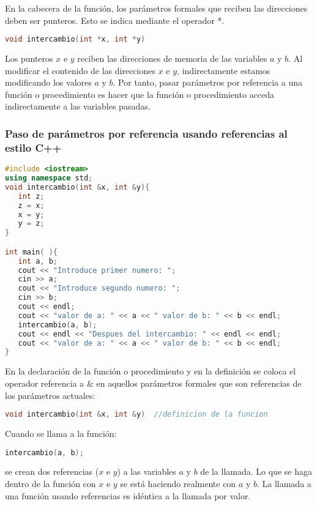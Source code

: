 En la cabecera de la función, los parámetros formales que reciben las direcciones deben ser punteros. Esto se indica mediante el operador *.

\begin{lstlisting}[language=C++]
void intercambio(int *x, int *y)
\end{lstlisting}

Los punteros $x$ e $y$ reciben las direcciones de memoria de las variables $a$ y $b$. Al modificar el contenido de las direcciones $x$ e $y$, indirectamente estamos modificando los valores $a$ y $b$. Por tanto, pasar parámetros por referencia a una función o procedimiento es hacer que la función o procedimiento acceda indirectamente a las variables pasadas. 

\subsubsection{Paso de parámetros por referencia usando referencias al estilo C++}
\begin{lstlisting}[language=C++]
#include <iostream>
using namespace std;
void intercambio(int &x, int &y){
   int z;                      
   z = x;
   x = y;
   y = z;
}

int main( ){
   int a, b;
   cout << "Introduce primer numero: ";
   cin >> a;
   cout << "Introduce segundo numero: ";
   cin >> b;
   cout << endl;
   cout << "valor de a: " << a << " valor de b: " << b << endl;
   intercambio(a, b); 
   cout << endl << "Despues del intercambio: " << endl << endl;
   cout << "valor de a: " << a << " valor de b: " << b << endl;
}
\end{lstlisting}

En la declaración de la función o procedimiento y en la definición se coloca el operador referencia a \& en aquellos parámetros formales que son referencias de los parámetros actuales:
\begin{lstlisting}[language=C++]
void intercambio(int &x, int &y)  //definicion de la funcion
\end{lstlisting}
Cuando se llama a la función:
\begin{lstlisting}[language=C++]  
intercambio(a, b);
\end{lstlisting} 

se crean dos referencias ($x$ e $y$) a las variables $a$ y $b$ de la llamada. Lo que se haga dentro de la función con $x$ e $y$ se está haciendo realmente con $a$ y $b$. La llamada a una función usando referencias es idéntica a la llamada por valor. 

